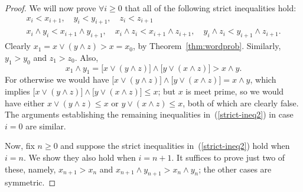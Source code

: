 \begin{proof}
We will now prove $\forall i \geq 0$ that all of the following strict inequalities hold:
\begin{gather}
x_i < x_{i+1}, \quad y_i < y_{i+1}, \quad z_i < z_{i+1}\nonumber \\
x_i \wedge y_i < x_{i+1} \wedge  y_{i+1}, \quad 
x_i \wedge z_i < x_{i+1} \wedge  z_{i+1}, \quad 
y_i \wedge z_i < y_{i+1} \wedge  z_{i+1}.\label{strict-ineq2}
\end{gather}
Clearly $x_1 = x \vee (y \wedge z) > x = x_0$, by Theorem~\ref{thm:wordprob}. 
Similarly, $y_1 > y_0$ and $z_1 > z_0$.  
Also, 
\[
x_1 \wedge y_1 = \bigl[x \vee (y \wedge z)\bigr] \wedge \bigl[y \vee (x \wedge z)\bigr]
 > x \wedge y.\]
For otherwise we would have
$\bigl[x \vee (y \wedge z)\bigr] \wedge \bigl[y \vee (x \wedge z)\bigr]
= x \wedge y$, which implies
$\bigl[x \vee (y \wedge z)\bigr] \wedge \bigl[y \vee (x \wedge z)\bigr]
\leq x$; but $x$ is meet prime, so we would have
either $x \vee (y \wedge z) \leq x$ or 
$y \vee (x \wedge z)\leq x$, both of which are clearly false.
The arguments establishing the remaining inequalities in~(\ref{strict-ineq2}) 
in case $i=0$ are similar.

Now, fix $n\geq 0$ and suppose the strict
inequalities in~(\ref{strict-ineq2}) hold when $i=n$.
We show they also hold when $i = n+1$.  It suffices to prove just two of these, namely,
$x_{n+1} > x_n$ and $x_{n+1} \wedge y_{n+1} > x_n \wedge y_n$; the other cases are symmetric. 


\end{proof}
